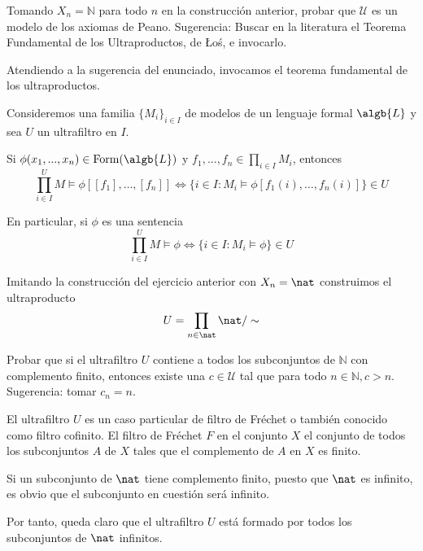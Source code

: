 \begin{problem}
Tomando $X_n = \mathbb{N}$ para todo $n$ en la construcción anterior, probar que $\mathcal{U}$ es un modelo de los axiomas de Peano. Sugerencia: Buscar en la literatura el Teorema Fundamental de los Ultraproductos, de {\L}o\'s, e invocarlo.

\solution

Atendiendo a la sugerencia del enunciado, invocamos el teorema fundamental de los ultraproductos.

\begin{theorem}
Consideremos una familia $\{M_i\}_{i\in I}$ de modelos de un lenguaje formal $\algb{L}$ y sea $U$ un ultrafiltro en $I$.

Si $\phi(x_1,...,x_n) \in \text{Form}(\algb{L})$ y $f_1,...,f_n \in \prod_{i \in I} M_i$, entonces
\[\prod_{i\in I}^U M \models \phi[[f_1], \ldots, [f_n]] \iff \{ i \in I : M_{i} \models \phi[f_1(i), \ldots, f_n(i) ] \} \in U\]

En particular, si $\phi$ es una sentencia
\[\prod_{i\in I}^U M \models \phi \iff \{ i \in I : M_i \models \phi\} \in U\]
\end{theorem}

Imitando la construcción del ejercicio anterior con $X_n = \nat$ construimos el ultraproducto
\[U = \prod_{n \in \nat}\nat/\sim\]

\end{problem}

\begin{problem}
Probar que si el ultrafiltro $U$ contiene a todos los subconjuntos de $\mathbb{N}$ con complemento finito, entonces
existe una $c\in \mathcal{U}$ tal que para todo $n\in \mathbb{N}, c>n$. Sugerencia: tomar $c_n = n$.

\solution

El ultrafiltro $U$ es un caso particular de filtro de Fréchet o también conocido como filtro cofinito. El filtro de Fréchet $F$ en el conjunto $X$ el conjunto de todos los subconjuntos $A$ de $X$ tales que el complemento de $A$ en $X$ es finito.

Si un subconjunto de $\nat$ tiene complemento finito, puesto que $\nat$ es infinito, es obvio que el subconjunto en cuestión será infinito.

Por tanto, queda claro que el ultrafiltro $U$ está formado por todos los subconjuntos de $\nat$ infinitos.

\end{problem}


